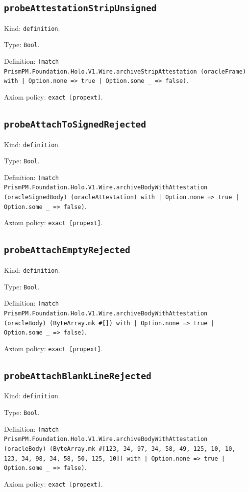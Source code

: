 \documentclass[11pt]{article}
\begin{document}
\subsection*{\texttt{probeAttestationStripUnsigned}}
\noindent Kind: \texttt{definition}.\par
\noindent Type: \texttt{Bool}.\par
\noindent Definition: \texttt{(match PrismPM.Foundation.Holo.V1.Wire.archiveStripAttestation (oracleFrame) with | Option.none => true | Option.some \_ => false)}.\par
\noindent Axiom policy: \texttt{exact [propext]}.\par
\subsection*{\texttt{probeAttachToSignedRejected}}
\noindent Kind: \texttt{definition}.\par
\noindent Type: \texttt{Bool}.\par
\noindent Definition: \texttt{(match PrismPM.Foundation.Holo.V1.Wire.archiveBodyWithAttestation (oracleSignedBody) (oracleAttestation) with | Option.none => true | Option.some \_ => false)}.\par
\noindent Axiom policy: \texttt{exact [propext]}.\par
\subsection*{\texttt{probeAttachEmptyRejected}}
\noindent Kind: \texttt{definition}.\par
\noindent Type: \texttt{Bool}.\par
\noindent Definition: \texttt{(match PrismPM.Foundation.Holo.V1.Wire.archiveBodyWithAttestation (oracleBody) (ByteArray.mk \#[]) with | Option.none => true | Option.some \_ => false)}.\par
\noindent Axiom policy: \texttt{exact [propext]}.\par
\subsection*{\texttt{probeAttachBlankLineRejected}}
\noindent Kind: \texttt{definition}.\par
\noindent Type: \texttt{Bool}.\par
\noindent Definition: \texttt{(match PrismPM.Foundation.Holo.V1.Wire.archiveBodyWithAttestation (oracleBody) (ByteArray.mk \#[123, 34, 97, 34, 58, 49, 125, 10, 10, 123, 34, 98, 34, 58, 50, 125, 10]) with | Option.none => true | Option.some \_ => false)}.\par
\noindent Axiom policy: \texttt{exact [propext]}.\par
\end{document}
